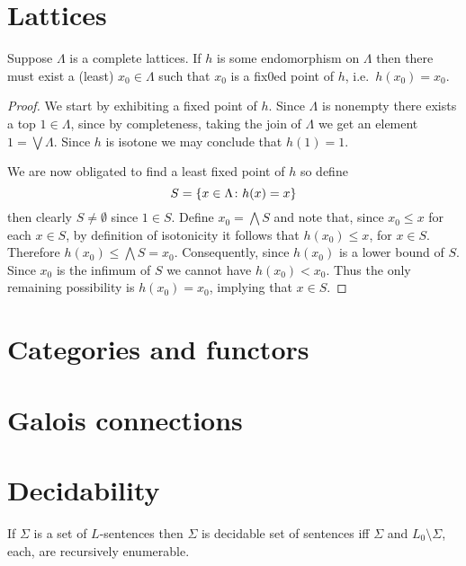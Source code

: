 \section{Lattices}

\begin{thm}
	Suppose $\Lambda$ is a complete lattices.  If $h$ is some endomorphism on $\Lambda$ then there must exist a (least) $x_0\in \Lambda$ such that $x_0$ is a fix0ed point of $h$, i.e.\ $h(x_0)=x_0$.
\end{thm}
\begin{proof}
	We start by exhibiting a fixed point of $h$.  Since $\Lambda$ is nonempty there exists a top $1\in\Lambda$, since by completeness, taking the join of $\Lambda$ we get an element $1=\bigvee\Lambda$.  Since $h$ is isotone we may conclude that $h(1)=1$.

	We are now obligated to find a least fixed point of $h$ so define
	\begin{equation}
		S=\left\lbrace x\in\Lambda\colon h(x)=x \right\rbrace
	\end{equation}  then clearly $S\neq\emptyset$ since $1\in S$.  Define $x_0=\bigwedge S$ and note that, since $x_0\leq x$ for each $x\in S$, by definition of isotonicity it follows that $h(x_0)\leq x$, for $x\in S$. Therefore $h(x_0)\leq\bigwedge S=x_0$.  Consequently, since $h(x_0)$ is a lower bound of $S$.  Since $x_0$ is the infimum of $S$ we cannot have $h(x_0)<x_0$.  Thus the only remaining possibility is $h(x_0)=x_0$, implying that $x\in S$.
\end{proof}


\section{Categories and functors}


\section{Galois connections}



\section{Decidability}

\begin{prp}
	If $\Sigma$ is a set of $L$-sentences then $\Sigma$ is decidable set of sentences iff $\Sigma$ and $L_0\setminus\Sigma$, each, are recursively enumerable.
\end{prp}

